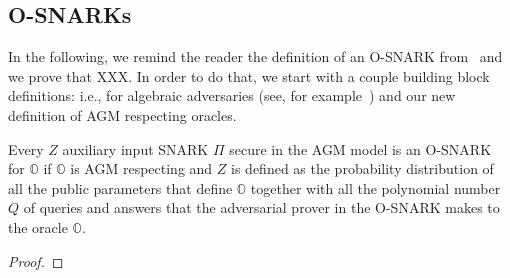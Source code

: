 \subsection{O-SNARKs}
\label{sec:short_snarks_defs}
In the following, we remind the reader the definition of an O-SNARK from~\cite{O_SNARK} and we prove that XXX.
In order to do that, we start with a couple building block definitions: i.e., for algebraic adversaries (see, for example~\cite{AGM_model}) 
and our new definition of AGM respecting oracles.

\begin{definition}
\label{def:algebraic_adv}
\end{definition}

\begin{definition}
\label{def:agm_oracles}
\end{definition}

\begin{definition}[O-SNARKs]
\label{def:osnarks}
\end{definition}

\begin{theorem}
\label{the:when_osnarks} 
Every $Z$ auxiliary input SNARK $\Pi$ secure in the AGM model is an 
O-SNARK for $\mathbb{O}$ if $\mathbb{O}$ is AGM respecting and 
$Z$ is defined as the probability distribution of all the public parameters that define 
$\mathbb{O}$ together with all the polynomial number $Q$ of queries and answers that 
the adversarial prover in the O-SNARK makes to the oracle $\mathbb{O}$.
\end{theorem}

\begin{proof}
\end{proof}


